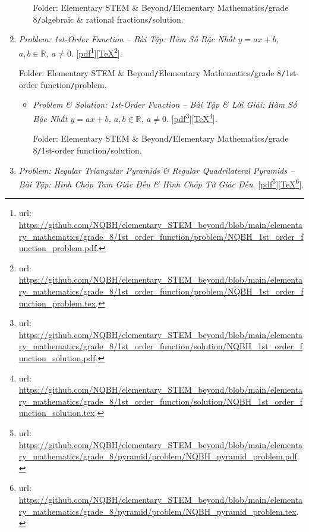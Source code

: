 \documentclass[12pt,oneside]{book}
\begin{document}
\begin{enumerate}
\begin{itemize}
		Folder: {\sf Elementary STEM \& Beyond{\tt/}Elementary Mathematics{\tt/}grade 8{\tt/}algebraic \& rational fractions{\tt/}solution}.
	\end{itemize}
	\item {\it Problem: 1st-Order Function -- Bài Tập: Hàm Số Bậc Nhất $y = ax + b$, $a,b\in\mathbb{R}$, $a\ne0$}. [\href{https://github.com/NQBH/elementary_STEM_beyond/blob/main/elementary_mathematics/grade_8/1st_order_function/problem/NQBH_1st_order_function_problem.pdf}{pdf}\footnote{{\sc url}: \url{https://github.com/NQBH/elementary_STEM_beyond/blob/main/elementary_mathematics/grade_8/1st_order_function/problem/NQBH_1st_order_function_problem.pdf}.}][\href{https://github.com/NQBH/elementary_STEM_beyond/blob/main/elementary_mathematics/grade_8/1st_order_function/problem/NQBH_1st_order_function_problem.tex}{\TeX}\footnote{{\sc url}: \url{https://github.com/NQBH/elementary_STEM_beyond/blob/main/elementary_mathematics/grade_8/1st_order_function/problem/NQBH_1st_order_function_problem.tex}.}].
	
	Folder: {\sf Elementary STEM \& Beyond{\tt/}Elementary Mathematics{\tt/}grade 8{\tt/}1st-order function{\tt/}problem}.
	\begin{itemize}
		\item {\it Problem \& Solution: 1st-Order Function -- Bài Tập \& Lời Giải: Hàm Số Bậc Nhất $y = ax + b$, $a,b\in\mathbb{R}$, $a\ne0$}. [\href{https://github.com/NQBH/elementary_STEM_beyond/blob/main/elementary_mathematics/grade_8/1st_order_function/solution/NQBH_1st_order_function_solution.pdf}{pdf}\footnote{{\sc url}: \url{https://github.com/NQBH/elementary_STEM_beyond/blob/main/elementary_mathematics/grade_8/1st_order_function/solution/NQBH_1st_order_function_solution.pdf}.}][\href{https://github.com/NQBH/elementary_STEM_beyond/blob/main/elementary_mathematics/grade_8/1st_order_function/solution/NQBH_1st_order_function_solution.tex}{\TeX}\footnote{{\sc url}: \url{https://github.com/NQBH/elementary_STEM_beyond/blob/main/elementary_mathematics/grade_8/1st_order_function/solution/NQBH_1st_order_function_solution.tex}.}].
		
		Folder: {\sf Elementary STEM \& Beyond{\tt/}Elementary Mathematics{\tt/}grade 8{\tt/}1st-order function{\tt/}solution}.
	\end{itemize}
	\item {\it Problem: Regular Triangular Pyramids {\it\&} Regular Quadrilateral Pyramids -- Bài Tập: Hình Chóp Tam Giác Đều {\it\&} Hình Chóp Tứ Giác Đều}. [\href{https://github.com/NQBH/elementary_STEM_beyond/blob/main/elementary_mathematics/grade_8/pyramid/problem/NQBH_pyramid_problem.pdf}{pdf}\footnote{{\sc url}: \url{https://github.com/NQBH/elementary_STEM_beyond/blob/main/elementary_mathematics/grade_8/pyramid/problem/NQBH_pyramid_problem.pdf}.}][\href{https://github.com/NQBH/elementary_STEM_beyond/blob/main/elementary_mathematics/grade_8/pyramid/problem/NQBH_pyramid_problem.tex}{\TeX}\footnote{{\sc url}: \url{https://github.com/NQBH/elementary_STEM_beyond/blob/main/elementary_mathematics/grade_8/pyramid/problem/NQBH_pyramid_problem.tex}.}].
	

\end{enumerate}
\end{document}
